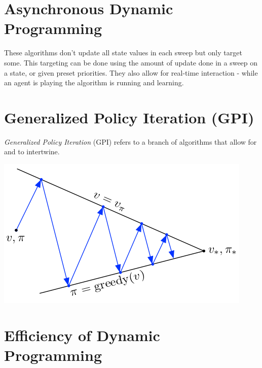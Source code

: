\section{Asynchronous Dynamic Programming}
These algorithms don't update all state values in each sweep but only target some.
This targeting can be done using the amount of update done in a sweep on a state, or given
preset priorities.
They also allow for real-time interaction - while an agent is playing the algorithm is running and learning.

\section{Generalized Policy Iteration (GPI)}
\label{sec:gpi}
\textit{Generalized Policy Iteration} (GPI) refers to a branch of algorithms
that allow for  and
 to intertwine.
\begin{center}
    \includegraphics[scale=0.43]{img/general_policy_iteration_diagram.png}
\end{center}

\section{Efficiency of Dynamic Programming}

